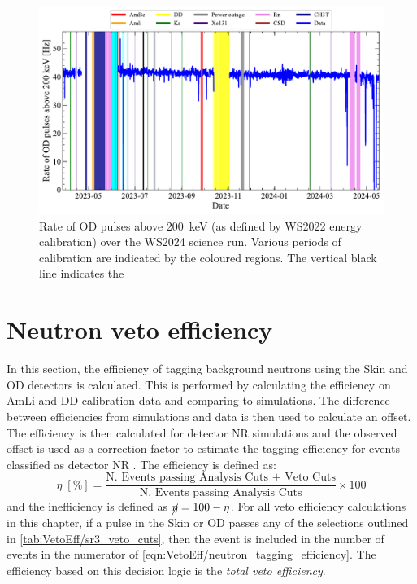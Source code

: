 \begin{figure}[!ht]
	\centering
	\includegraphics[width=\textwidth]{figures/VetoEfficiency/prem_od_stability.pdf}
	\caption[Rate of OD pulses above 200~keV over the WS2024 science run.]{Rate of OD pulses above 200~keV (as defined by WS2022 energy calibration) over the WS2024 science run. Various periods of calibration are indicated by the coloured regions. The vertical black line indicates the }
	\label{fig:VetoEff/deadtime_stability_prem}
\end{figure}

\section{Neutron veto efficiency}\label{sec:VetoEff/efficiency}
In this section, the efficiency of tagging background neutrons using the Skin and OD detectors is calculated.
This is performed by calculating the efficiency on AmLi and DD calibration data and comparing to simulations.
The difference between efficiencies from simulations and data is then used to calculate an offset.
The efficiency is then calculated for detector NR simulations and the observed offset is used as a correction factor to estimate the tagging efficiency for events classified as detector NR \cite{LZ:2022ysc,LZ:2024zvo}.
The efficiency is defined as:
\begin{equation}\label{eqn:VetoEff/neutron_tagging_efficiency}
	\eta\;[\%] = \frac{\textrm{N. Events passing Analysis Cuts + Veto Cuts}}{\textrm{N. Events passing Analysis Cuts}} \times 100
\end{equation}
and the inefficiency is defined as $\cancel{\eta}=100-\eta$. For all veto efficiency calculations in this chapter, if a pulse in the Skin or OD passes any of the selections outlined in \autoref{tab:VetoEff/sr3_veto_cuts}, then the event is included in the number of events in the numerator of \autoref{eqn:VetoEff/neutron_tagging_efficiency}. The efficiency based on this decision logic is the \textit{total veto efficiency}.

